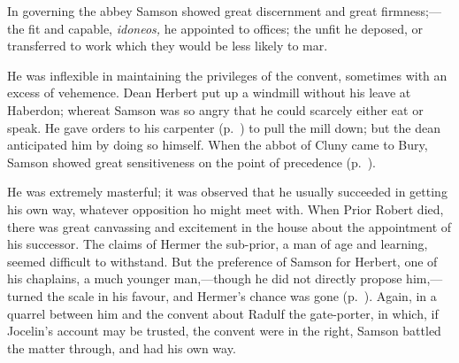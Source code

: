 \documentclass[10pt]{book}
\begin{document}
{In governing the abbey Samson showed great discernment and great firmness;---the fit and capable, \emph{idoneos,} he appointed to offices; the unfit he deposed, or transferred to work which they would be less likely to mar.

He was inflexible in maintaining the privileges of the convent, sometimes with an excess of vehemence. Dean Herbert put up a windmill without his leave at Haberdon; whereat Samson was so angry that he could scarcely either eat or speak. He gave orders to his carpenter (p.\ ) to pull the mill down; but the dean anticipated him by doing so himself. When the abbot of Cluny came to Bury, Samson showed great sensitiveness on the point of precedence (p.\ ).

He was extremely masterful; it was observed that he usually succeeded in getting his own way, whatever opposition ho might meet with. When Prior Robert died, there was great canvassing and excitement in the house about the appointment of his successor. The claims of Hermer the sub-prior, a man of age and learning, seemed difficult to withstand. But the preference of Samson for Herbert, one of his chaplains, a much younger man,---though he did not directly propose him,---turned the scale in his favour, and Hermer's chance was gone (p.\ ). Again, in a quarrel between him and the convent about Radulf the gate-porter, in which, if Jocelin's account may be trusted, the convent were in the right, Samson battled the matter through, and had his own way.

}
\end{document}
